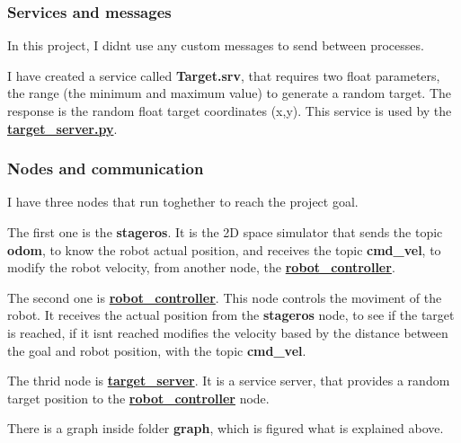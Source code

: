 \subsubsection*{Services and messages}


\begin{DoxyItemize}
\item In this project, I didn\textquotesingle{}t use any custom messages to send between processes.
\item I have created a service called {\bfseries Target.\+srv}, that requires two float parameters, the range (the minimum and maximum value) to generate a random target. The response is the random float target coordinates (x,y). This service is used by the {\bfseries \hyperlink{target__server_8py}{target\+\_\+server.\+py}}.
\end{DoxyItemize}

\subsubsection*{Nodes and communication}

I have three nodes that run toghether to reach the project goal.
\begin{DoxyItemize}
\item The first one is the {\bfseries stageros}. It is the 2D space simulator that sends the topic {\bfseries odom}, to know the robot actual position, and receives the topic {\bfseries cmd\+\_\+vel}, to modify the robot velocity, from another node, the {\bfseries \hyperlink{namespacerobot__controller}{robot\+\_\+controller}}.
\item The second one is {\bfseries \hyperlink{namespacerobot__controller}{robot\+\_\+controller}}. This node controls the moviment of the robot. It receives the actual position from the {\bfseries stageros} node, to see if the target is reached, if it isn\textquotesingle{}t reached modifies the velocity based by the distance between the goal and robot position, with the topic {\bfseries cmd\+\_\+vel}.
\item The thrid node is {\bfseries \hyperlink{namespacetarget__server}{target\+\_\+server}}. It is a service server, that provides a random target position to the {\bfseries \hyperlink{namespacerobot__controller}{robot\+\_\+controller}} node.
\end{DoxyItemize}

There is a graph inside folder {\bfseries graph}, which is figured what is explained above. 
